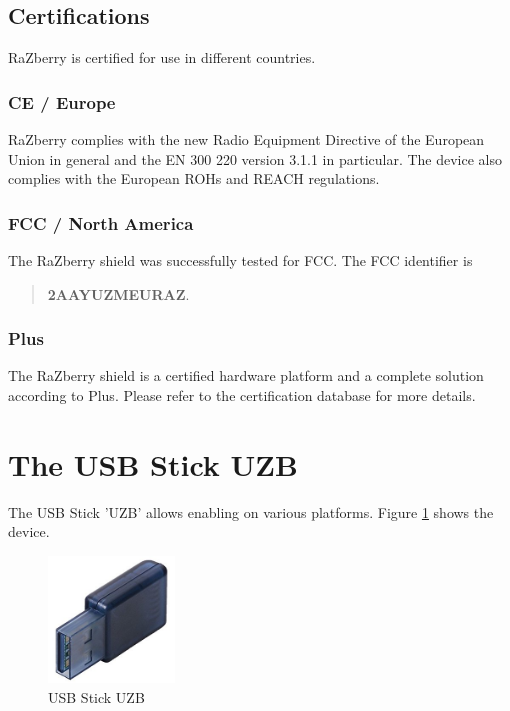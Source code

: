 \subsection{Certifications}

RaZberry is certified for use in different countries.

\subsubsection {CE / Europe}

RaZberry complies with the new Radio Equipment Directive of the European Union in general 
and the EN 300 220 version 3.1.1 in particular. The device also complies with the European ROHs and REACH regulations.

\subsubsection {FCC / North America}

The RaZberry shield was successfully tested for FCC. The FCC identifier is

\begin{quote}
\textbf{2AAYUZMEURAZ}.
\end{quote}

\subsubsection {\zwave Plus}

The RaZberry shield is a certified hardware platform and a complete solution according to 
\zwave Plus. Please refer to the certification database 
 for more details.


\section{The USB Stick UZB}

The USB Stick 'UZB' allows enabling \zway on various platforms. Figure \ref{uzb} shows the device.

\begin{figure}
\begin{center}
\includegraphics[width=0.3\textwidth]{pngs/cap2/uzb.jpg}
\caption{USB Stick UZB}
\label{uzb}
\end{center}
\end{figure}

